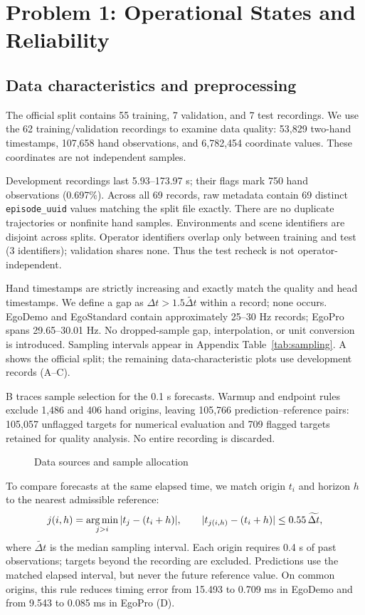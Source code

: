 \section{Problem 1: Operational States and Reliability}
\subsection{Data characteristics and preprocessing}
The official split contains 55 training, 7 validation, and 7 test recordings. We use the 62 training/validation recordings to examine data quality: 53,829 two-hand timestamps, 107,658 hand observations, and 6,782,454 coordinate values. These coordinates are not independent samples.

Development recordings last 5.93--173.97 s; their flags mark 750 hand observations (0.697\%). Across all 69 records, raw metadata contain 69 distinct \texttt{episode\_uuid} values matching the split file exactly. There are no duplicate trajectories or nonfinite hand samples. Environments and scene identifiers are disjoint across splits. Operator identifiers overlap only between training and test (3 identifiers); validation shares none. Thus the test recheck is not operator-independent.

Hand timestamps are strictly increasing and exactly match the quality and head timestamps. We define a gap as $\Delta t>1.5\widetilde{\Delta t}$ within a record; none occurs. EgoDemo and EgoStandard contain approximately 25--30 Hz records; EgoPro spans 29.65--30.01 Hz. No dropped-sample gap, interpolation, or unit conversion is introduced. Sampling intervals appear in Appendix Table~\ref{tab:sampling}. A shows the official split; the remaining data-characteristic plots use development records (A--C).

B traces sample selection for the 0.1 s forecasts. Warmup and endpoint rules exclude 1,486 and 406 hand origins, leaving 105,766 prediction--reference pairs: 105,057 unflagged targets for numerical evaluation and 709 flagged targets retained for quality analysis. No entire recording is discarded.

\begin{figure}[!htbp]
\centering
{}
\caption{Data sources and sample allocation}
\label{fig:data}
\end{figure}

To compare forecasts at the same elapsed time, we match origin $t_i$ and horizon $h$ to the nearest admissible reference:
\begin{equation}
j(i,h)=\operatorname*{arg\,min}_{j>i}|t_j-(t_i+h)|,\qquad
|t_{j(i,h)}-(t_i+h)|\leq0.55\,\widetilde{\Delta t},
\label{eq:alignment}
\end{equation}
\noindent where $\widetilde{\Delta t}$ is the median sampling interval. Each origin requires 0.4 s of past observations; targets beyond the recording are excluded. Predictions use the matched elapsed interval, but never the future reference value. On common origins, this rule reduces timing error from 15.493 to 0.709 ms in EgoDemo and from 9.543 to 0.085 ms in EgoPro (D).

